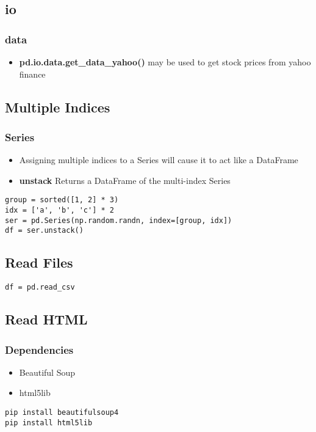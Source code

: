 \subsection{io}

%
\subsubsection{data}
  \begin{itemize}

    \item \textbf{pd.io.data.get\_data\_yahoo()} may be used to get stock prices
      from yahoo finance
  \end{itemize}

%
\subsection{Multiple Indices}

%
\subsubsection{Series}
\begin{itemize}
  \item Assigning multiple indices to a Series will cause it to act like a
    DataFrame

  \item \textbf{unstack} Returns a DataFrame of the multi-index Series
\end{itemize}
\begin{lstlisting}
group = sorted([1, 2] * 3)
idx = ['a', 'b', 'c'] * 2
ser = pd.Series(np.random.randn, index=[group, idx])
df = ser.unstack()
\end{lstlisting}

\subsection{Read Files}
\begin{lstlisting}
df = pd.read_csv
\end{lstlisting}

\subsection{Read HTML}

%
\subsubsection{Dependencies}
\begin{itemize}

  \item Beautiful Soup

  \item html5lib
\end{itemize}
\begin{lstlisting}
pip install beautifulsoup4
pip install html5lib
\end{lstlisting}

